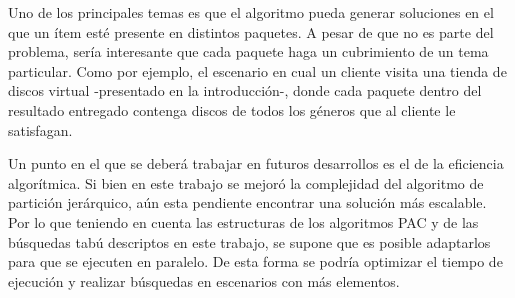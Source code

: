 Uno de los principales temas es que el algoritmo pueda generar soluciones en el que un ítem esté presente en distintos paquetes. A pesar de que no es parte del problema, sería interesante que cada paquete haga un cubrimiento de un tema particular. Como por ejemplo, el escenario en cual un cliente visita una tienda de discos virtual -presentado en la introducción-, donde cada paquete dentro del resultado entregado contenga discos de todos los géneros que al cliente le satisfagan.

Un punto en el que se deberá trabajar en futuros desarrollos es el de la eficiencia algorítmica. Si bien en este trabajo se mejoró la complejidad del algoritmo de partición jerárquico, aún esta pendiente encontrar una solución más escalable. Por lo que teniendo en cuenta las estructuras de los algoritmos PAC y de las búsquedas tabú descriptos en este trabajo, se supone que es posible adaptarlos para que se ejecuten en paralelo. De esta forma se podría optimizar el tiempo de ejecución y realizar búsquedas en escenarios con más elementos.